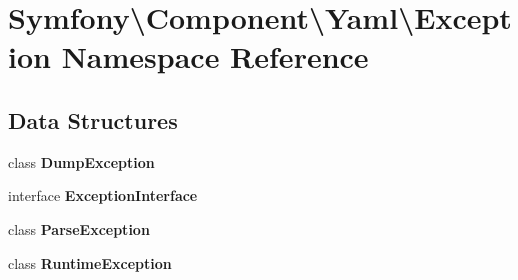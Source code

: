 \section{Symfony\textbackslash{}Component\textbackslash{}Yaml\textbackslash{}Exception Namespace Reference}
\label{namespace_symfony_1_1_component_1_1_yaml_1_1_exception}
\subsection*{Data Structures}
\begin{DoxyCompactItemize}
\item 
class {\bf Dump\+Exception}
\item 
interface {\bf Exception\+Interface}
\item 
class {\bf Parse\+Exception}
\item 
class {\bf Runtime\+Exception}
\end{DoxyCompactItemize}
